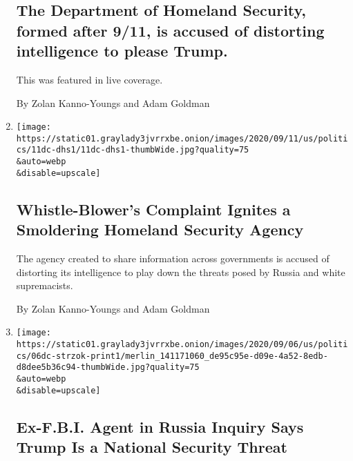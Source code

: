 \begin{enumerate}
  \hypertarget{the-department-of-homeland-security-formed-after-911-is-accused-of-distorting-intelligence-to-please-trump}{%
  \subsection{The Department of Homeland Security, formed after 9/11, is
  accused of distorting intelligence to please
  Trump.}\label{the-department-of-homeland-security-formed-after-911-is-accused-of-distorting-intelligence-to-please-trump}}

  This was featured in live coverage.

  By Zolan Kanno-Youngs and Adam Goldman
\item
  \href{/2020/09/11/us/politics/whistle-blower-homeland-security.html}{}

  \texttt{[image: https://static01.graylady3jvrrxbe.onion/images/2020/09/11/us/politics/11dc-dhs1/11dc-dhs1-thumbWide.jpg?quality=75\\\&auto=webp\\\&disable=upscale]}

  \hypertarget{whistle-blowers-complaint-ignites-a-smoldering-homeland-security-agency}{%
  \subsection{Whistle-Blower's Complaint Ignites a Smoldering Homeland
  Security
  Agency}\label{whistle-blowers-complaint-ignites-a-smoldering-homeland-security-agency}}

  The agency created to share information across governments is accused
  of distorting its intelligence to play down the threats posed by
  Russia and white supremacists.

  By Zolan Kanno-Youngs and Adam Goldman
\item
  \href{/2020/09/05/us/politics/peter-strzok-book.html}{}

  \texttt{[image: https://static01.graylady3jvrrxbe.onion/images/2020/09/06/us/politics/06dc-strzok-print1/merlin\_141171060\_de95c95e-d09e-4a52-8edb-d8dee5b36c94-thumbWide.jpg?quality=75\\\&auto=webp\\\&disable=upscale]}

  \hypertarget{ex-fbi-agent-in-russia-inquiry-says-trump-is-a-national-security-threat}{%
  \subsection{Ex-F.B.I. Agent in Russia Inquiry Says Trump Is a National
  Security
  Threat}\label{ex-fbi-agent-in-russia-inquiry-says-trump-is-a-national-security-threat}}


\end{enumerate}
